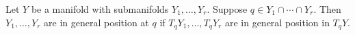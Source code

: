 Let $Y$ be a manifold with submanifolds $Y_1, \ldots, Y_r$. Suppose $q \in Y_1 \cap \cdots \cap Y_r$. Then $Y_1, \ldots, Y_r$ are in general position at $q$ if $T_q Y_1, \ldots, T_q Y_r$ are in general position in $T_q Y$.
